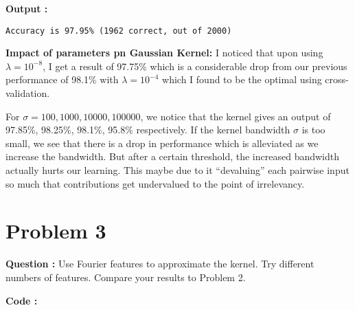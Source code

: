 \documentclass[a4paper, 11pt]{article}
\begin{document}
\textbf{Output :}
\begin{verbatim}
Accuracy is 97.95% (1962 correct, out of 2000)
\end{verbatim}

\textbf{Impact of parameters pn Gaussian Kernel:}
I noticed that upon using $\lambda = 10^{-8}$, I get a result of 97.75\% which is a considerable drop from our previous performance of 98.1\% with $\lambda = 10^{-4}$ which I found to be the optimal using cross-validation.

For $\sigma = 100, 1000, 10000, 100000$, we notice that the kernel gives an output of 97.85\%, 98.25\%, 98.1\%, 95.8\% respectively. If the kernel bandwidth $\sigma$ is too small, we see that there is a drop in performance which is alleviated as we increase the bandwidth. But after a certain threshold, the increased bandwidth actually hurts our learning. This maybe due to it ``devaluing'' each pairwise input so much that contributions get undervalued to the point of irrelevancy.

\clearpage

\section*{Problem 3}

\textbf{Question :} Use Fourier features to approximate the kernel. Try different numbers of features. Compare your results to Problem 2.

\textbf{Code :}
\end{document}
